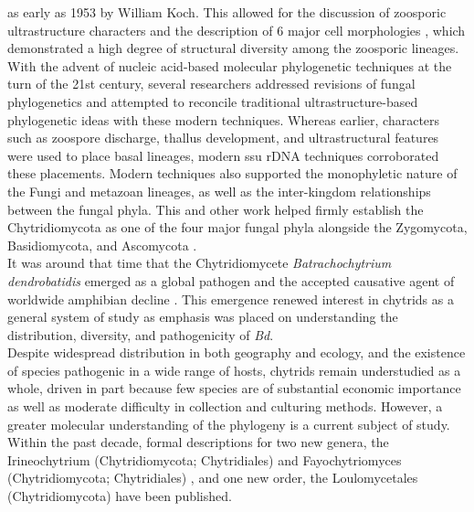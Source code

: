 as early as 1953 by William Koch. This allowed for the discussion
of zoosporic ultrastructure characters \cite{Koch1958motileI,Koch1958motileII}
and the description of 6 major cell morphologies \cite{Koch1961motileIII},
which demonstrated a high degree of structural diversity among the zoosporic lineages. \\
\indent With the advent of nucleic acid-based molecular phylogenetic techniques
at the turn of the 21st century, several researchers addressed revisions of
fungal phylogenetics and attempted to reconcile traditional ultrastructure-based
phylogenetic ideas with these modern techniques. Whereas earlier, characters such
as zoospore discharge, thallus development, and ultrastructural features were used
to place basal lineages, modern ssu rDNA techniques corroborated these placements.
Modern techniques also supported the monophyletic nature of the Fungi and metazoan
lineages, as well as the inter-kingdom relationships between the fungal phyla. This
and other work helped firmly establish the Chytridiomycota as one of the four major
fungal phyla alongside the Zygomycota, Basidiomycota, and Ascomycota
\cite{Bruns1991,Bruns1992,Wainright1993,James2006sixGene,James2006Blasto,Hibbett2007}.\\
\indent It was around that time that the Chytridiomycete
\textit{Batrachochytrium dendrobatidis} emerged as a global pathogen
and the accepted causative agent of worldwide amphibian decline
\cite{Berger1998}. This emergence renewed interest in chytrids 
as a general system of study as emphasis was placed on understanding the distribution, 
diversity, and pathogenicity of \textit{Bd}.\\
\indent Despite widespread distribution in both geography and ecology,
and the existence of species pathogenic in a wide range of hosts,
chytrids remain understudied as a whole, driven in part because few
species are of substantial economic importance
\cite{Powell1993,James2000} as well as moderate difficulty in
collection and culturing methods. However, a greater molecular 
understanding of the phylogeny is a current subject of study. 
Within the past decade, formal descriptions for two new genera, 
the Irineochytrium (Chytridiomycota; Chytridiales) \cite{Letcher2014} 
and Fayochytriomyces (Chytridiomycota; Chytridiales) \cite{Davis2015}, 
and one new order, the Loulomycetales (Chytridiomycota) \cite{Simmons2009} 
have been published.\\

